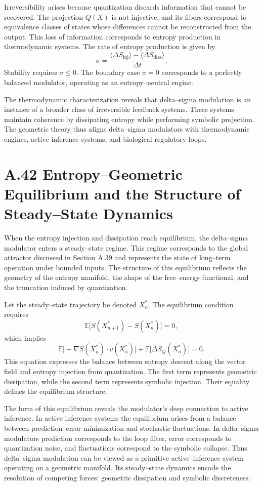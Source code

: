 Irreversibility arises because quantization discards information that cannot be recovered. The projection \(Q(X)\) is not injective, and its fibers correspond to equivalence classes of states whose differences cannot be reconstructed from the output. This loss of information corresponds to entropy production in thermodynamic systems. The rate of entropy production is given by
\[
\sigma = \frac{\langle \Delta S_{\mathrm{inj}} \rangle - \langle \Delta S_{\mathrm{diss}} \rangle}{\Delta t}.
\]
Stability requires \(\sigma \le 0\). The boundary case \(\sigma = 0\) corresponds to a perfectly balanced modulator, operating as an entropy–neutral engine.

The thermodynamic characterization reveals that delta–sigma modulation is an instance of a broader class of irreversible feedback systems. These systems maintain coherence by dissipating entropy while performing symbolic projection. The geometric theory thus aligns delta–sigma modulators with thermodynamic engines, active inference systems, and biological regulatory loops.

\section{A.42 Entropy–Geometric Equilibrium and the Structure of Steady–State Dynamics}

When the entropy injection and dissipation reach equilibrium, the delta–sigma modulator enters a steady–state regime. This regime corresponds to the global attractor discussed in Section A.39 and represents the state of long–term operation under bounded inputs. The structure of this equilibrium reflects the geometry of the entropy manifold, the shape of the free–energy functional, and the truncation induced by quantization.

Let the steady–state trajectory be denoted \(X_n^\ast\). The equilibrium condition requires
\[
\mathbb{E}\bigl[ S(X_{n+1}^\ast) - S(X_n^\ast) \bigr] = 0,
\]
which implies
\[
\mathbb{E}\bigl[ -\nabla S(X_n^\ast) \cdot v(X_n^\ast) \bigr] + \mathbb{E}\bigl[ \Delta S_Q(X_n^\ast) \bigr] = 0.
\]
This equation expresses the balance between entropy descent along the vector field and entropy injection from quantization. The first term represents geometric dissipation, while the second term represents symbolic injection. Their equality defines the equilibrium structure.

The form of this equilibrium reveals the modulator’s deep connection to active inference. In active inference systems the equilibrium arises from a balance between prediction–error minimization and stochastic fluctuations. In delta–sigma modulators prediction corresponds to the loop filter, error corresponds to quantization noise, and fluctuations correspond to the symbolic collapse. Thus delta–sigma modulation can be viewed as a primitive active–inference system operating on a geometric manifold. Its steady–state dynamics encode the resolution of competing forces: geometric dissipation and symbolic discreteness.

